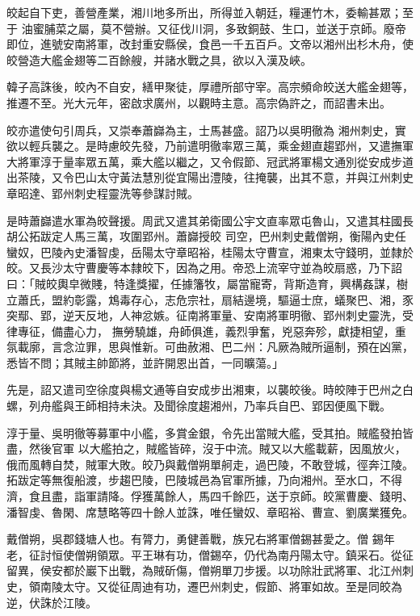 \begin{pinyinscope}
 皎起自下吏，善營產業，湘川地多所出，所得並入朝廷，糧運竹木，委輸甚眾；至于
 油蜜脯菜之屬，莫不營辦。又征伐川洞，多致銅鼓、生口，並送于京師。廢帝即位，進號安南將軍，改封重安縣侯，食邑一千五百戶。文帝以湘州出杉木舟，使皎營造大艦金翅等二百餘艘，并諸水戰之具，欲以入漢及峽。



 韓子高誅後，皎內不自安，繕甲聚徒，厚禮所部守宰。高宗頻命皎送大艦金翅等，推遷不至。光大元年，密啟求廣州，以觀時主意。高宗偽許之，而詔書未出。



 皎亦遣使句引周兵，又崇奉蕭巋為主，士馬甚盛。詔乃以吳明徹為
 湘州刺史，實欲以輕兵襲之。是時慮皎先發，乃前遣明徹率眾三萬，乘金翅直趨郢州，又遣撫軍大將軍淳于量率眾五萬，乘大艦以繼之，又令假節、冠武將軍楊文通別從安成步道出茶陵，又令巴山太守黃法慧別從宜陽出澧陵，往掩襲，出其不意，并與江州刺史章昭達、郢州刺史程靈洗等參謀討賊。



 是時蕭巋遣水軍為皎聲援。周武又遣其弟衛國公宇文直率眾屯魯山，又遣其柱國長胡公拓跋定人馬三萬，攻圍郢州。蕭巋授皎
 司空，巴州刺史戴僧朔，衡陽內史任蠻奴，巴陵內史潘智虔，岳陽太守章昭裕，桂陽太守曹宣，湘東太守錢明，並隸於皎。又長沙太守曹慶等本隸皎下，因為之用。帝恐上流宰守並為皎扇惑，乃下詔曰：「賊皎輿皁微賤，特逢獎擢，任據籓牧，屬當寵寄，背斯造育，興構姦謀，樹立蕭氏，盟約彰露，鴆毒存心，志危宗社，扇結邊境，驅逼士庶，蟻聚巴、湘，豕突鄢、郢，逆天反地，人神忿嫉。征南將軍量、安南將軍明徹、郢州刺史靈洗，受律專征，備盡心力，
 撫勞驍雄，舟師俱進，義烈爭奮，兇惡奔殄，獻捷相望，重氛載廓，言念泣罪，思與惟新。可曲赦湘、巴二州：凡厥為賊所逼制，預在凶黨，悉皆不問；其賊主帥節將，並許開恩出首，一同曠蕩。」



 先是，詔又遣司空徐度與楊文通等自安成步出湘東，以襲皎後。時皎陣于巴州之白螺，列舟艦與王師相持未決。及聞徐度趨湘州，乃率兵自巴、郢因便風下戰。



 淳于量、吳明徹等募軍中小艦，多賞金銀，令先出當賊大艦，受其拍。賊艦發拍皆盡，然後官軍
 以大艦拍之，賊艦皆碎，沒于中流。賊又以大艦載薪，因風放火，俄而風轉自焚，賊軍大敗。皎乃與戴僧朔單舸走，過巴陵，不敢登城，徑奔江陵。拓跋定等無復船渡，步趨巴陵，巴陵城邑為官軍所據，乃向湘州。至水口，不得濟，食且盡，詣軍請降。俘獲萬餘人，馬四千餘匹，送于京師。皎黨曹慶、錢明、潘智虔、魯閑、席慧略等四十餘人並誅，唯任蠻奴、章昭裕、曹宣、劉廣業獲免。



 戴僧朔，吳郡錢塘人也。有膂力，勇健善戰，族兄右將軍僧錫甚愛之。僧
 錫年老，征討恒使僧朔領眾。平王琳有功，僧錫卒，仍代為南丹陽太守。鎮采石。從征留異，侯安都於巖下出戰，為賊斫傷，僧朔單刀步援。以功除壯武將軍、北江州刺史，領南陵太守。又從征周迪有功，遷巴州刺史，假節、將軍如故。至是同皎為逆，伏誅於江陵。




\end{pinyinscope}
